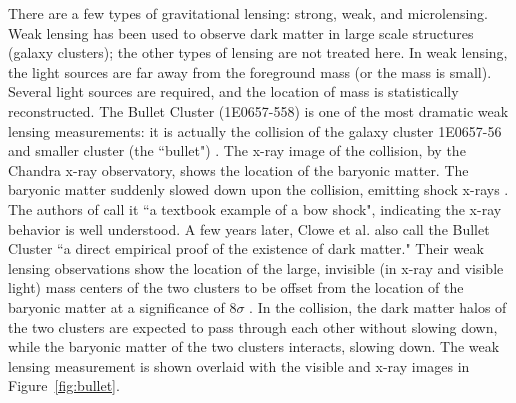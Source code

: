 There are a few types of gravitational lensing: strong, weak, and microlensing. Weak lensing has been used to observe dark matter in large scale structures (galaxy clusters); the other types of lensing are not treated here. In weak lensing, the light sources are far away from the foreground mass (or the mass is small). Several light sources are required, and the location of mass is statistically reconstructed. The Bullet Cluster (1E0657-558) is one of the most dramatic weak lensing measurements: it is actually the collision of the galaxy cluster 1E0657-56 and smaller cluster (the ``bullet") \cite{Markevitch2001}. The x-ray image of the collision, by the Chandra x-ray observatory, shows the location of the baryonic matter. The baryonic matter suddenly slowed down upon the collision, emitting shock x-rays  \cite{Markevitch2001}. The authors of \cite{Markevitch2001} call it ``a textbook example of a bow shock", indicating the x-ray behavior is well understood. A few years later, Clowe et al. also call the Bullet Cluster ``a direct empirical proof of the existence of dark matter." Their weak lensing observations show the location of the large, invisible (in x-ray and visible light) mass centers of the two clusters to be offset from the location of the baryonic matter at a significance of 8$\sigma$ \cite{Clowe2006}. In the collision, the dark matter halos of the two clusters are expected to pass through each other without slowing down, while the baryonic matter of the two clusters interacts, slowing down. The weak lensing measurement is shown overlaid with the visible and x-ray images in Figure~\ref{fig:bullet}. 

